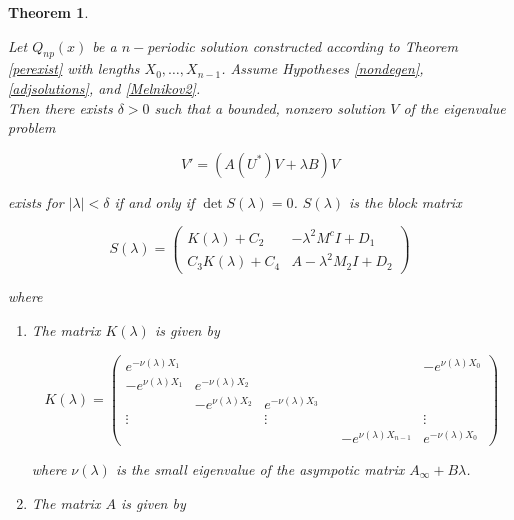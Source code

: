 \documentclass[12pt]{article}
\newtheorem{theorem}{Theorem}
\begin{document}
\begin{theorem}\label{PDEeigtheorem}

Let $Q_{np}(x)$ be a $n-$periodic solution constructed according to Theorem \ref{perexist} with lengths $X_0, \dots, X_{n-1}$. Assume Hypotheses \ref{nondegen}, \ref{adjsolutions}, and \ref{Melnikov2}.\\

Then there exists $\delta > 0$ such that a bounded, nonzero solution $V$ of the eigenvalue problem 

\begin{equation}
V' = ( A(U^*)V + \lambda B)V 
\end{equation}

exists for $|\lambda| < \delta$ if and only if $\det S(\lambda) = 0$. $S(\lambda)$ is the block matrix

\begin{equation}\label{blockmatrix}
S(\lambda) = 
\begin{pmatrix}
K(\lambda) + C_2 & -\lambda^2 M^c I + D_1 \\
C_3 K(\lambda) + C_4 & A - \lambda^2 M_2 I + D_2
\end{pmatrix}
\end{equation}

where 

\begin{enumerate}

\item The matrix $K(\lambda)$ is given by

\begin{equation}
K(\lambda) = 
\begin{pmatrix}
e^{-\nu(\lambda)X_1} & & & & & -e^{\nu(\lambda)X_0} \\
-e^{\nu(\lambda)X_1} & e^{-\nu(\lambda)X_2} \\
& -e^{\nu(\lambda)X_2} & e^{-\nu(\lambda)X_3} \\
\vdots & & \vdots & &&  \vdots \\
& & & & -e^{\nu(\lambda)X_{n-1}} & e^{-\nu(\lambda)X_0} 
\end{pmatrix}
\end{equation}

where $\nu(\lambda)$ is the small eigenvalue of the asympotic matrix $A_\infty + B \lambda$.

\item The matrix $A$ is given by


\end{enumerate}
\end{theorem}
\end{document}
